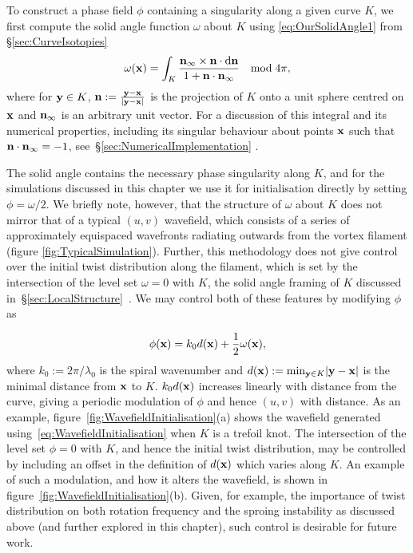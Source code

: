 To construct a phase field $\phi$ containing a singularity along a given curve $K$, we first compute the solid angle function $\omega$ about $K$ using \eqref{eq:OurSolidAngle1} from \S\ref{sec:CurveIsotopies}~\citep{Binysh2018} 
\begin{equation}
    \omega({\bf x}) = \int_{K} \frac{{\bf n}_\infty \times {\bf n} \cdot \mathrm{d}{\bf n}}{1 + {\bf n} \cdot {\bf n}_\infty} \quad \mathrm{mod}\;4\pi,
    \label{eq:SolidAngle}
\end{equation}
where for ${\bf y} \in K$, ${\bf n} := \frac{{\bf y} - {\bf x}}{|{\bf y}-\bf{x}|}$ is the projection of $K$ onto a unit sphere centred on $\bf x$ and ${\bf n}_\infty$ is an arbitrary unit vector. For a discussion of this integral and its numerical properties, including its singular behaviour about points ${\bf x}$ such that ${\bf n} \cdot {\bf n}_\infty = -1$, see~\S\ref{sec:NumericalImplementation} \citep{Binysh2018}. 
    

The solid angle contains the necessary phase singularity along $K$, and for the simulations discussed in this chapter we use it for initialisation directly by setting $\phi = \omega/2$. We briefly note, however, that the structure of $\omega$ about $K$ does not mirror that of a typical $(u,v)$ wavefield, which consists of a series of approximately equispaced wavefronts radiating outwards from the vortex filament (figure \ref{fig:TypicalSimulation}). Further, this methodology does not give control over the initial twist distribution along the filament, which is set by the intersection of the level set $\omega=0$ with $K$, the solid angle framing of $K$ discussed in~\S\ref{sec:LocalStructure}~\citep{Binysh2018}. We may control both of these features by modifying $\phi$ as
    
\begin{equation}
\phi({\bf x}) = k_0 d({\bf x}) + \frac{1}{2} \omega({\bf x}), 
\label{eq:WavefieldInitialisation}
\end{equation}
where $k_0 := 2\pi / \lambda_0$ is the spiral wavenumber and $d({\bf x}):= \mathrm{min}_{{\bf y} \in K} |{\bf y}- {\bf x}|$ is the minimal distance from ${\bf x}$ to $K$. $k_0 d({\bf x})$ increases linearly with distance from the curve, giving a periodic modulation of $\phi$ and hence $(u,v)$ with distance. As an example, figure~\ref{fig:WavefieldInitialisation}(a) shows the wavefield generated using~\eqref{eq:WavefieldInitialisation} when $K$ is a trefoil knot. The intersection of the level set $\phi=0$ with $K$, and hence the initial twist distribution, may be controlled by including an offset in the definition of $d({\bf x})$ which varies along $K$. An example of such a modulation, and how it alters the wavefield, is shown in figure~\ref{fig:WavefieldInitialisation}(b). Given, for example, the importance of twist distribution on both rotation frequency and the sproing instability as discussed above (and further explored in this chapter), such control is desirable for future work.

